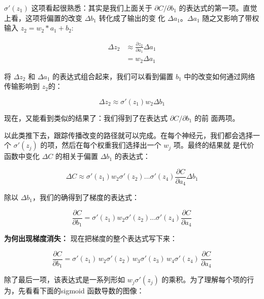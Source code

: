 $\sigma'(z_1)$ 这项看起很熟悉：其实是我们上面关于 $\partial C/\partial b_1$
的表达式的第一项。直觉上看，这项将偏置的改变 $\Delta b_1$ 转化成了输出的变
化 $\Delta a_1$。$\Delta a_1$ 随之又影响了带权输入 $z_2 = w_2 * a_1 +
b_2$:

\begin{align}
  \Delta z_2 & \approx
  \frac{\partial z_2}{\partial a_1} \Delta a_1 \label{eq:117}\tag{117}\\
  & = w_2 \Delta a_1 \label{eq:118}\tag{118}
\end{align}

将 $\Delta z_2$ 和 $\Delta a_1$ 的表达式组合起来，我们可以看到偏置 $b_1$
中的改变如何通过网络传输影响到 $z_2$的：

\begin{equation}
  \Delta z_2 \approx \sigma'(z_1) w_2 \Delta b_1
  \label{eq:119}\tag{119}
\end{equation}
 
现在，又能看到类似的结果了：我们得到了在表达式 $\partial C/\partial b_1$ 的前
面两项。

以此类推下去，跟踪传播改变的路径就可以完成。在每个神经元，我们都会选择一
个 $\sigma'(z_j)$ 的项，然后在每个权重我们选择出一个 $w_j$ 项。最终的结果就
是代价函数中变化 $\Delta C$ 的相关于偏置 $\Delta b_1$ 的表达式：

\begin{equation}
  \Delta C \approx \sigma'(z_1) w_2 \sigma'(z_2) \ldots \sigma'(z_4)
  \frac{\partial C}{\partial a_4} \Delta b_1
\label{eq:120}\tag{120}
\end{equation}

除以 $\Delta b_1$，我们的确得到了梯度的表达式：
 
\begin{equation}
  \frac{\partial C}{\partial b_1} = \sigma'(z_1) w_2 \sigma'(z_2) \ldots
  \sigma'(z_4) \frac{\partial C}{\partial a_4}
\label{eq:121}\tag{121}
\end{equation}
 
\textbf{为何出现梯度消失：} 现在把梯度的整个表达式写下来： 

\begin{equation}
  \frac{\partial C}{\partial b_1} = \sigma'(z_1) \, w_2 \sigma'(z_2) \, w_3
  \sigma'(z_3) \, w_4 \sigma'(z_4) \, \frac{\partial C}{\partial a_4}
  \label{eq:122}\tag{122}
\end{equation}
 
除了最后一项，该表达式是一系列形如 $w_j \sigma'(z_j)$ 的乘积。为了理解每个项的行
为，先看看下面的sigmoid 函数导数的图像：
 
